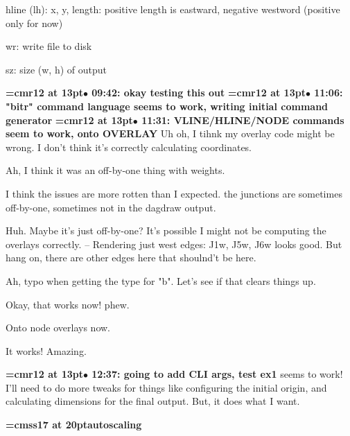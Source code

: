 hline (lh): x, y, length: positive length is eastward, negative westword (positive only for now)
\par

wr: write file to disk
\par

sz: size (w, h) of output
\par

{\smallskip\noindent\bf\font\titlefont=cmr12 at 13pt\titlefont $\bullet$ 09:42: okay testing this out}\smallskip
{\smallskip\noindent\bf\font\titlefont=cmr12 at 13pt\titlefont $\bullet$ 11:06: "bitr" command language seems to work, writing initial command generator}\smallskip
{\smallskip\noindent\bf\font\titlefont=cmr12 at 13pt\titlefont $\bullet$ 11:31: VLINE/HLINE/NODE commands seem to work, onto OVERLAY}\smallskip
Uh oh, I tihnk my overlay code might be wrong. I don't think it's correctly calculating coordinates.
\par

Ah, I think it was an off-by-one thing with weights.
\par

I think the issues are more rotten than I expected. the junctions are sometimes off-by-one, sometimes not in the dagdraw output.
\par

Huh. Maybe it's just off-by-one? It's possible I might not be computing the overlays correctly. -- Rendering just west edges: J1w, J5w, J6w looks good. But hang on, there are other edges here that shoulnd't be here.
\par

Ah, typo when getting the type for "b". Let's see if that clears things up.
\par

Okay, that works now! phew.
\par

Onto node overlays now.
\par

It works! Amazing.
\par

{\smallskip\noindent\bf\font\titlefont=cmr12 at 13pt\titlefont $\bullet$ 12:37: going to add CLI args, test ex1}\smallskip
seems to work! I'll need to do more tweaks for things like configuring the initial origin, and calculating dimensions for the final output. But, it does what I want.
\par

{\medskip\noindent\bf\font\titlefont=cmss17 at 20pt\titlefont autoscaling}\medskip

